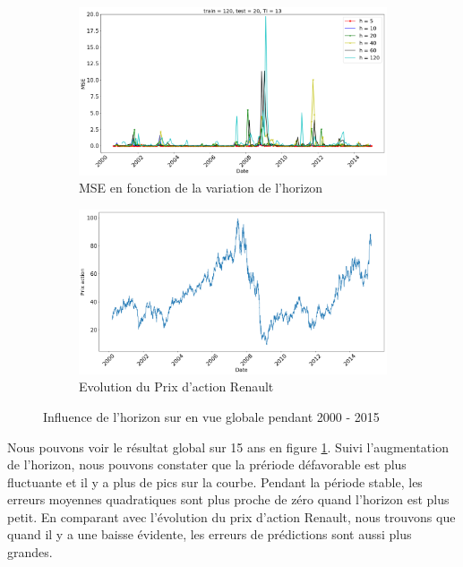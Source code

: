 \begin{figure}[H]
	\centering
	\begin{subfigure}{.5\textwidth}
	\includegraphics[width=.9\linewidth, scale=0.2]
	{plot/MSE_120_h_20.png}
	\caption{MSE en fonction de la variation de l'horizon}
	\label{fig:Horizon}
	\end{subfigure}%
	\begin{subfigure}{.5\textwidth}
	\centering
	\includegraphics[width=.9\linewidth, scale=0.2]
	{plot/Prix_action_global.png}
	\caption{Evolution du Prix d'action Renault}
	\label{fig:Prix_action}
	\end{subfigure}
\caption{Influence de l'horizon sur en vue globale pendant 2000 - 2015}
\label{fig:Horizon_global}
\end{figure}

Nous pouvons voir le résultat global sur 15 ans en figure \ref{fig:Horizon}. Suivi l'augmentation de l'horizon, nous pouvons constater que la prériode défavorable est plus fluctuante et il y a plus de pics sur la courbe. Pendant la période stable, les erreurs moyennes quadratiques sont plus proche de zéro quand l'horizon est plus petit. En comparant avec l'évolution du prix d'action Renault, nous trouvons que quand il y a une baisse évidente, les erreurs de prédictions sont aussi plus grandes. \\

